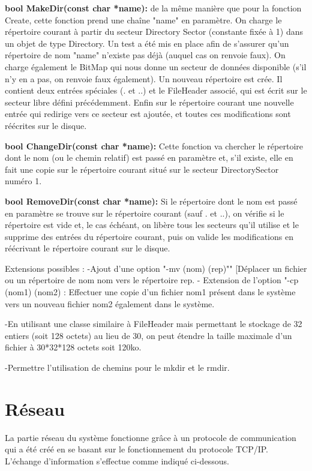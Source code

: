 \documentclass[12pt]{report}
\begin{document}
\textbf{bool MakeDir(const char *name):} de la même manière que pour la fonction Create, cette fonction prend une chaîne "name" en paramètre. On charge le répertoire courant à partir du secteur Directory	Sector (constante fixée à 1) dans un objet de type Directory. Un test a été mis en place afin de  s'assurer qu'un répertoire de nom "name" n'existe pas déjà (auquel cas on renvoie faux). On charge également le BitMap qui nous donne un secteur de données disponible (s'il n'y en a pas, on renvoie faux également). 
Un nouveau répertoire est crée. Il contient deux entrées spéciales (. et ..) et le FileHeader associé, qui est écrit sur le secteur libre défini précédemment. Enfin sur le répertoire courant une nouvelle entrée qui redirige vers ce secteur est ajoutée, et toutes ces modifications sont réécrites sur le disque.
\bigskip


\textbf{bool ChangeDir(const char *name):} Cette fonction va chercher le répertoire dont le nom (ou le chemin relatif) est passé en paramètre et, s'il existe, elle en fait une copie sur le répertoire courant situé sur le secteur DirectorySector numéro 1.
\bigskip

\textbf{bool RemoveDir(const char *name):} Si le répertoire dont le nom est passé en paramètre se trouve sur le répertoire courant (sauf . et ..), on vérifie si le répertoire est vide et, le cas échéant, on libère tous les secteurs qu'il utilise et le supprime des entrées du répertoire courant, puis on valide les modifications en réécrivant le répertoire courant sur le disque.
\bigskip


Extensions possibles : 
-Ajout d'une option "-mv (nom) (rep)"" [Déplacer un fichier ou un répertoire de nom nom vers le répertoire rep.
- Extension de l'option "-cp (nom1) (nom2) : Effectuer une copie d'un fichier nom1 présent dans le système vers un nouveau fichier nom2 également dans le système.

-En utilisant une classe similaire à FileHeader mais permettant le stockage de 32 entiers (soit 128 octets) au lieu de 30, on peut étendre la taille maximale d'un fichier à 30*32*128 octets soit 120ko.

-Permettre l'utilisation de chemins pour le mkdir et le rmdir.



\section{Réseau}

La partie réseau du système fonctionne grâce à un protocole de communication qui a été créé en se basant sur le fonctionnement du protocole TCP/IP. L'échange d'information s'effectue comme indiqué ci-dessous.
\end{document}
